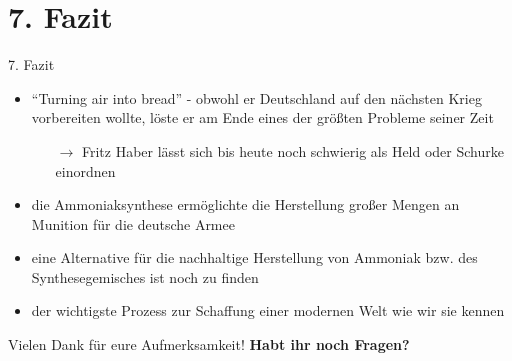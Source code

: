\documentclass[
    aspectratio=1610
    ]{beamer}
\begin{document}
    \section{\textbf{7.} Fazit}

    \begin{frame}{7. Fazit}
        \begin{itemize}
            \item ``Turning air into bread'' - obwohl er Deutschland auf den nächsten Krieg vorbereiten wollte, löste er am Ende eines der größten Probleme seiner Zeit
            \begin{itemize}
                \item[$\rightarrow$] Fritz Haber lässt sich bis heute noch schwierig als Held oder Schurke einordnen
            \end{itemize} 
            \item die Ammoniaksynthese ermöglichte die Herstellung großer Mengen an Munition für die deutsche Armee
            \item eine Alternative für die nachhaltige Herstellung von Ammoniak bzw. des Synthesegemisches ist noch zu finden
            \item der wichtigste Prozess zur Schaffung einer modernen Welt wie wir sie kennen
        \end{itemize}
    \end{frame}

    \begin{frame}{Vielen Dank für eure Aufmerksamkeit!}
        \large\textbf{Habt ihr noch Fragen?}
    \end{frame}
    
\end{document}

